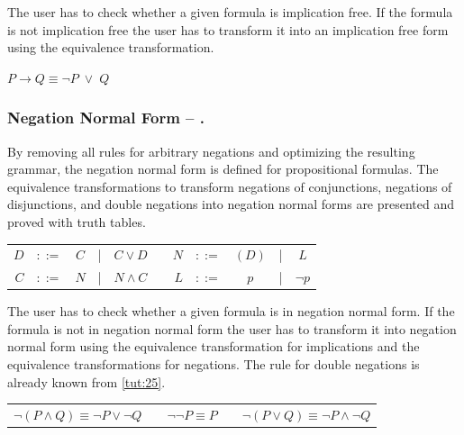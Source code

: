The user has to check whether a given formula is implication free.
If the formula is not implication free the user has to transform it into an implication free form
using the equivalence transformation.

\begin{table}[htdp]
\begin{center}
$P \rightarrow Q \equiv \neg P \;\vee\; Q$
\end{center}
\end{table}

\subsubsection{Negation Normal Form – .}
\label{tut:42}
By removing all rules for arbitrary negations 
and optimizing the resulting grammar, 
the negation normal form is defined  for propositional formulas. 
The equivalence transformations to transform negations of conjunctions,
negations of disjunctions, 
and double negations
into negation normal forms are presented 
and proved with truth tables.

\begin{center}
\begin{tabular}{rccclp{1cm}rcccc}
$D$		&$::=$ & $C$ 		&|& 	$C \vee D$	&&	$N$		&$::=$ & $(D)$ 	&|& 	$L$\\
$C$		&$::=$ & $N$ 		&|& 	$N \wedge C$ 	&&	$L$		&$::=$ & $p $ 		&|& 	$\neg p$
\end{tabular}
\end{center}

The user has to check whether a given formula is in negation normal form.
If the formula is not in negation normal form
the user has to transform it into negation normal form
using the equivalence transformation for implications and the equivalence transformations for negations.
The rule for double negations is already known from \vref{tut:25}.

\begin{center}
\begin{tabular}{cp{5mm}cp{5mm}c}
$\neg (P \wedge Q) \equiv \neg P \vee \neg Q$& &
$\neg \neg P \equiv P$ & &
$\neg (P \vee Q)  \equiv \neg P \wedge \neg Q$
\end{tabular}
\end{center}


